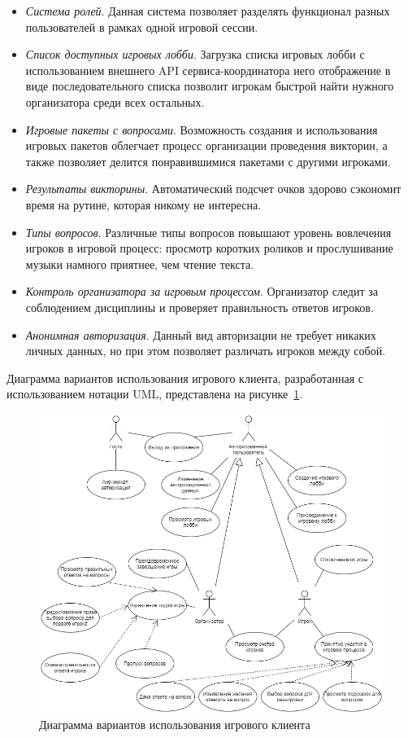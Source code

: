 \begin{itemize}
	\item \emph{Система ролей}. Данная система позволяет разделять функционал разных пользователей в рамках одной игровой сессии.
	\item \emph{Список доступных игровых лобби}. Загрузка списка игровых лобби с использованием внешнего API сервиса-координатора иего отображение в виде последовательного списка позволит игрокам быстрой найти нужного организатора среди всех остальных.
	\item \emph{Игровые пакеты с вопросами}. Возможность создания и использования игровых пакетов облегчает процесс организации проведения викторин, а также позволяет делится понравившимися пакетами с другими игроками.
	\item \emph{Результаты викторины}. Автоматический подсчет очков здорово сэкономит время на рутине, которая никому не интересна.
	\item \emph{Типы вопросов}. Различные типы вопросов повышают уровень вовлечения игроков в игровой процесс: просмотр коротких роликов и прослушивание музыки намного приятнее, чем чтение текста.
	\item \emph{Контроль организатора за игровым процессом}. Организатор следит за соблюдением дисциплины и проверяет правильность ответов игроков.
	\item \emph{Анонимная авторизация}. Данный вид авторизации не требует никаких личных данных, но при этом позволяет различать игроков между собой.
\end{itemize}

Диаграмма вариантов использования игрового клиента, разработанная с использованием нотации UML, представлена на рисунке~\ref{fig:domain:model:use_cases:model_game}.

\begin{figure}[ht]
\centering
	\includegraphics[scale=0.5]{attachments/use_case_model_game.png}
	\caption{Диаграмма вариантов использования игрового клиента}
	\label{fig:domain:model:use_cases:model_game}
\end{figure}

